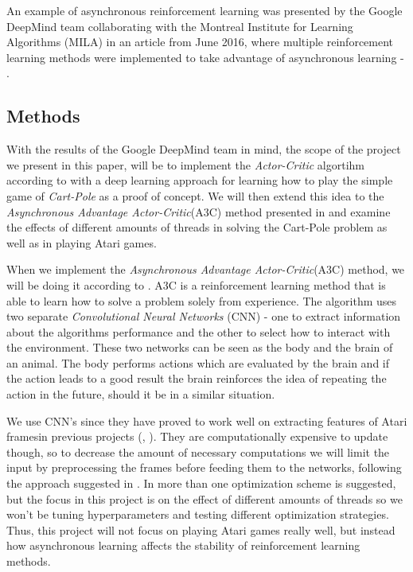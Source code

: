 \documentclass[11pt]{article}
\begin{document}
An example of asynchronous reinforcement learning was presented by the
Google DeepMind team collaborating with the Montreal Institute for Learning
Algorithms (MILA) in an article from June 2016, where multiple 
reinforcement learning methods were implemented to take advantage of
asynchronous learning\cite{a3c} - .

\subsection{Methods}

With the results of the Google DeepMind team in mind\cite{a3c}, the scope of the project we present in
this paper, will be to implement the \textit{Actor-Critic} algortihm according to \cite{RLbook}
with a deep learning approach for learning how to play the simple game of \textit{Cart-Pole}\cite{cart_pole}
as a proof of concept.
We will then extend this idea to the \textit{Asynchronous Advantage Actor-Critic}(A3C)
method presented in \cite{a3c} and examine the effects of different amounts of threads
in solving the Cart-Pole problem as well as in playing Atari games.

When we implement the \textit{Asynchronous Advantage Actor-Critic}(A3C)
method, we will be doing it according to \cite{a3c}.
A3C is a reinforcement learning method that is able to learn
how to solve a problem solely from experience.
The algorithm uses two separate \textit{Convolutional Neural Networks}
(CNN) - one to extract information about the algorithms performance 
and the other to select how to interact with the environment.
These two networks can be seen as the body and the brain of an animal.
The body performs actions which are evaluated by the brain and if
the action leads to a good result the brain reinforces the idea
of repeating the action in the future, should it be in a similar
situation.

We use CNN's since they have proved to work well on extracting features
of Atari framesin previous projects (\cite{dqn}, \cite{a3c}).
They are computationally expensive to update though,
so to decrease the amount of necessary computations we will limit
the input by preprocessing the frames before feeding them
to the networks, following the approach suggested in \cite{dqn-nature}.
In \cite{a3c} more than one optimization scheme
is suggested, but the focus in this project is on the effect of
different amounts of threads so we won't be tuning hyperparameters
and testing different optimization strategies.
Thus, this project will not focus on playing Atari games really well,
but instead how asynchronous learning affects the stability of
reinforcement learning methods.
\end{document}
